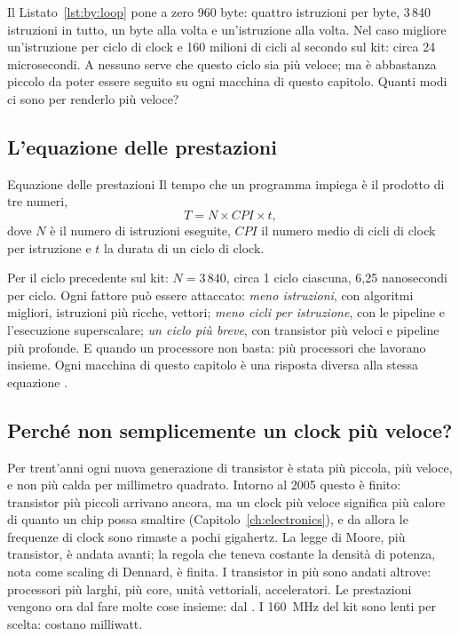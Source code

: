 Il Listato~\ref{lst:by:loop} pone a zero 960 byte: quattro istruzioni per byte,
3\,840 istruzioni in tutto, un byte alla volta e un'istruzione alla volta. Nel
caso migliore un'istruzione per ciclo di clock e 160 milioni di cicli al
secondo sul kit: circa 24 microsecondi. A nessuno serve che questo ciclo sia
più veloce; ma è abbastanza piccolo da poter essere seguito su ogni macchina di
questo capitolo. Quanti modi ci sono per renderlo più veloce?

\subsection{L'equazione delle prestazioni}

\begin{theorem}{Equazione delle prestazioni}
Il tempo che un programma impiega è il prodotto di tre numeri,
\[ T = N\times \mathit{CPI}\times t , \]
dove $N$ è il numero di istruzioni eseguite, $\mathit{CPI}$ il numero medio di
cicli di clock per istruzione e $t$ la durata di un ciclo di clock.
\end{theorem}

Per il ciclo precedente sul kit: $N=3\,840$, circa 1 ciclo ciascuna, 6,25
nanosecondi per ciclo. Ogni fattore può essere attaccato: \emph{meno
istruzioni}, con algoritmi migliori, istruzioni più ricche, vettori;
\emph{meno cicli per istruzione}, con le pipeline e l'esecuzione superscalare;
\emph{un ciclo più breve}, con transistor più veloci e pipeline più profonde.
E quando un processore non basta: più processori che lavorano insieme. Ogni
macchina di questo capitolo è una risposta diversa alla stessa equazione
\citep{patterson2020}.

\subsection{Perché non semplicemente un clock più veloce?}

Per trent'anni ogni nuova generazione di transistor è stata più piccola, più
veloce, e non più calda per millimetro quadrato. Intorno al 2005 questo è
finito: transistor più piccoli arrivano ancora, ma un clock più veloce
significa più calore di quanto un chip possa smaltire
(Capitolo~\ref{ch:electronics}), e da allora le frequenze di clock sono rimaste
a pochi gigahertz. La legge di Moore, più transistor, è andata avanti; la
regola che teneva costante la densità di potenza, nota come scaling di Dennard,
è finita. I transistor in più sono andati altrove: processori più larghi, più
core, unità vettoriali, acceleratori. Le prestazioni vengono ora dal fare molte
cose insieme: dal . I 160~MHz del kit sono lenti per scelta:
costano milliwatt.

